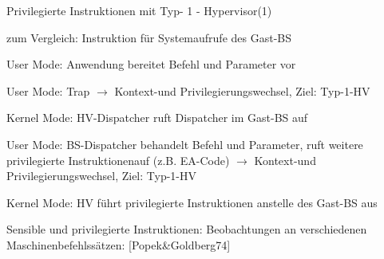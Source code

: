 \documentclass[a4paper]{article}
\begin{document}
\begin{multicols}{3}
    \begin{itemize*}
        \item
    \end{itemize*}

    Privilegierte Instruktionen mit Typ- 1 - Hypervisor(1)

    \begin{itemize*}
        \item
        zum Vergleich: Instruktion für Systemaufrufe des Gast-BS
    \end{itemize*}

    \begin{enumerate*}
        \item
        User Mode: Anwendung bereitet Befehl und Parameter vor
        \item
        User Mode: Trap $\rightarrow$ Kontext-und
        Privilegierungswechsel, Ziel: Typ-1-HV
        \item
        Kernel Mode: HV-Dispatcher ruft Dispatcher im Gast-BS auf
        \item
        User Mode: BS-Dispatcher behandelt Befehl und Parameter, ruft weitere
        privilegierte Instruktionenauf (z.B. EA-Code)
        $\rightarrow$ Kontext-und Privilegierungswechsel,
        Ziel: Typ-1-HV
        \item
        Kernel Mode: HV führt privilegierte Instruktionen anstelle des Gast-BS
        aus
    \end{enumerate*}

    \begin{itemize*}
        \item
    \end{itemize*}

    Sensible und privilegierte Instruktionen: Beobachtungen an verschiedenen
    Maschinenbefehlssätzen: {[}Popek\&Goldberg74{]}


\end{multicols}
\end{document}
